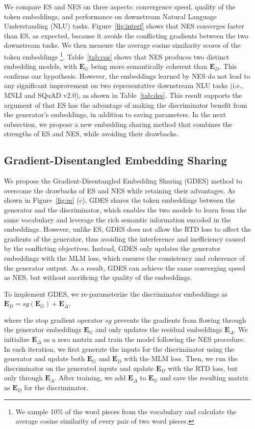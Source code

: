 We compare ES and NES on three aspects: convergence speed, quality of the token embeddings, and performance on downstream Natural Language Understanding (NLU) tasks. Figure~\ref{fig:interf} shows that NES converges faster than ES, as expected, because it avoids the conflicting gradients between the two downstream tasks. We then measure the average cosine similarity scores of the token embeddings \footnote{We sample 10\% of the word pieces from the vocabulary and calculate the average cosine similarity of every pair of two word pieces. }. Table~\ref{tab:cos} shows that NES produces two distinct embedding models, with $\bm E_{G}$ being more semantically coherent than $\bm E_{D}$. This confirms our hypothesis. However, the embeddings learned by NES do not lead to any significant improvement on two representative downstream NLU tasks (i.e., MNLI and SQuAD v2.0), as shown in Table~\ref{tab:des}. This result supports the argument of \cite{clark2020electra} that ES has the advantage of making the discriminator benefit from the generator's embeddings, in addition to saving parameters. In the next subsection, we propose a new embedding sharing method that combines the strengths of ES and NES, while avoiding their drawbacks.

\subsection{Gradient-Disentangled Embedding Sharing}
\label{sec:des}

We propose the Gradient-Disentangled Embedding Sharing (GDES) method to overcome the drawbacks of ES and NES while retaining their advantages. As shown in Figure~\ref{fig:es} (c), GDES shares the token embeddings between the generator and the discriminator, which enables the two models to learn from the same vocabulary and leverage the rich semantic information encoded in the embeddings. However, unlike ES, GDES does not allow the RTD loss to affect the gradients of the generator, thus avoiding the interference and inefficiency caused by the conflicting objectives. Instead, GDES only updates the generator embeddings with the MLM loss, which ensures the consistency and coherence of the generator output.  As a result, GDES can achieve the same converging speed as NES, but without sacrificing the quality of the embeddings. 

To implement GDES, we re-parameterize the discriminator embeddings as $\bm{E}_D = sg(\bm{E}_G) + \bm{E}_\Delta$,

where the stop gradient operator $sg$ prevents the gradients from flowing through the generator embeddings $\bm{E}_G$ and only updates the residual embeddings $\bm{E}_\Delta$. We initialize $\bm{E}_\Delta$ as a zero matrix and train the model following the NES procedure. In each iteration, we first generate the inputs for the discriminator using the generator and update both $\bm{E}_G$ and $\bm{E}_D$ with the MLM loss. Then, we run the discriminator on the generated inputs and update $\bm{E}_D$ with the RTD loss, but only through $\bm{E}_\Delta$. After training, we add $\bm{E}_\Delta$ to $\bm{E}_G$ and save the resulting matrix as $\bm{E}_D$ for the discriminator.

